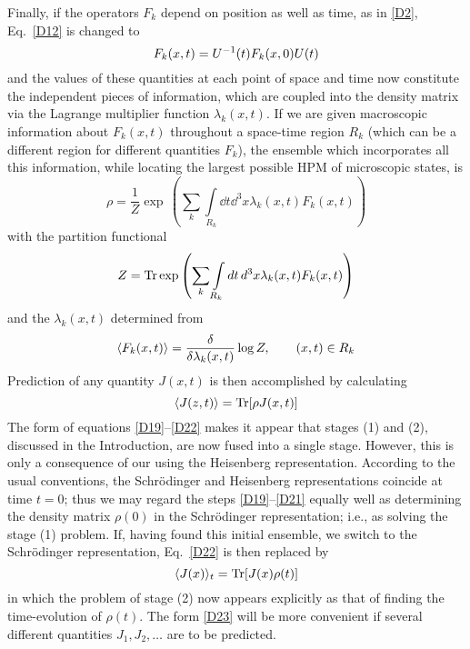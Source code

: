 Finally, if the operators $F_k$ depend on position as well as time, as in \eqref{D2}, Eq.~\eqref{D12} is changed to
\begin{equation}
	\label{D18}
	F_k(x, t) = U^{-1}(t) F_k(x, 0) U(t)
\end{equation}
and the values of these quantities at each point of space and time now constitute the independent pieces of information, which are coupled into the density matrix via the Lagrange multiplier function $\lambda_k(x,t)$. If we are given macroscopic information about $F_k(x, t)$ throughout a space-time region $R_k$ (which can be a different region for different quantities $F_k$), the ensemble which incorporates all this information, while locating the largest possible HPM of microscopic states, is
\begin{equation}
	\label{D19}
	\rho = \frac{1}{Z} \exp\,\left(\sum_{k} \int\limits_{R_k} \dd t \dd^3 x  \lambda_k(x, t) F_k(x, t) \right)
\end{equation}
with the partition functional
\begin{equation}
	\label{D20}
	Z = \Tr \exp\,\left(\sum_{k} \int\limits_{R_k} \dd t \dd^3 x  \lambda_k(x, t) F_k(x, t) \right)
\end{equation}
and the $\lambda_k(x, t)$ determined from
\begin{equation}
	\label{D21}
	\mean{F_k(x, t)} = \fdv*{\log Z}{\lambda_k(x, t)}, \qquad (x, t) \in R_k
\end{equation}
Prediction of any quantity $J(x, t)$ is then accomplished by calculating
\begin{equation}
	\label{D22}
	\langle J(z, t)\rangle = \operatorname{Tr} [\rho J(x, t)]
\end{equation}
The form of equations \eqref{D19}--\eqref{D22} makes it appear that stages (1) and (2), discussed in the Introduction, are now fused into a single stage.
However, this is only a consequence of our using the Heisenberg representation.
According to the usual conventions, the Schrödinger and Heisenberg representations coincide at time $t=0$; thus we may regard the steps \eqref{D19}--\eqref{D21} equally well as determining the density matrix $\rho(0)$ in the Schrödinger representation; i.e., as solving the stage (1) problem.
If, having found this initial ensemble, we switch to the Schrödinger representation, Eq.~\eqref{D22} is then replaced by
\begin{equation}
	\label{D23}
	\langle J(x)\rangle_t = \operatorname{Tr}[J(x) \rho(t)]
\end{equation}
in which the problem of stage (2) now appears explicitly as that of finding the time-evolution of $\rho(t)$.
The form \eqref{D23} will be more convenient if several different quantities $J_1, J_2, \ldots$ are to be predicted.


